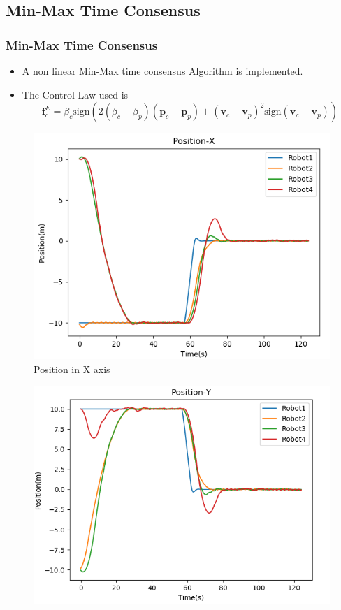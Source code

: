 \documentclass[10pt]{beamer}
\begin{document}
\subsection*{Min-Max Time Consensus}
\begin{frame}
	\frametitle{Min-Max Time Consensus}
	\begin{itemize}
		\item A non linear Min-Max time consensus Algorithm is implemented.
		\item The Control Law used is
		      \begin{equation*}
			      \mathbf{f}^E_c=\beta_c\text{sign}(2(\beta_c-\beta_p)(\mathbf{p}_c-\mathbf{p}_p)+(\mathbf{v}_c-\mathbf{v}_p)^2\text{sign}(\mathbf{v}_c-\mathbf{v}_p))
		      \end{equation*}
	\end{itemize}
	\begin{minipage}{0.47\textwidth}
		\begin{figure}[h!]
			\centering
			\includegraphics[scale=0.27]{Position-X-minmax.png}
			\caption{Position in X axis}
			\label{Fig:pos_x_m}
		\end{figure}
	\end{minipage}
	\begin{minipage}{0.47\textwidth}
		\begin{figure}[h!]
			\centering
			\includegraphics[scale=0.27]{Position-Y-minmax.png}

\end{figure}
\end{minipage}
\end{frame}
\end{document}
